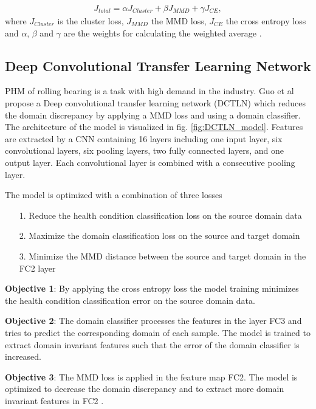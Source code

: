 \begin{equation}
    \begin{aligned}
    J_{total} = \alpha J_{Cluster} + \beta J_{MMD} + \gamma J_{CE}, 
    \end{aligned}
\end{equation}
where $J_{Cluster}$ is the cluster loss, $J_{MMD}$ the MMD loss,  $J_{CE}$ the cross entropy loss and $\alpha$, $\beta$ and $\gamma$ are the weights for calculating the weighted average \cite{Li2018}.


\subsection{Deep Convolutional Transfer Learning Network}
PHM of rolling bearing is a task with high demand in the industry. Guo et al \cite{Guo2019} propose a Deep convolutional transfer learning network (DCTLN) which reduces the domain discrepancy by applying a MMD loss and using a domain classifier. The architecture of the model is visualized in fig. \ref{fig:DCTLN_model}. Features are extracted by a CNN containing 16 layers including one input layer, six convolutional layers, six pooling layers, two fully connected layers, and one output layer. Each convolutional layer is combined with a consecutive pooling layer.


The model is optimized with a combination of three losses
\begin{itemize}
    \item [1.] Reduce the health condition classification loss on the source domain data
    \item [2.] Maximize the domain classification loss on the source and target domain 
    \item [3.] Minimize the MMD distance between the source and target domain in the FC2 layer
\end{itemize}

\textbf{Objective 1}: By applying the cross entropy loss the model training minimizes the health condition classification error on the source domain data.

\textbf{Objective 2}: The domain classifier processes the features in the layer FC3 and tries to predict the corresponding domain of each sample. The model is trained to extract domain invariant features such that the error of the domain classifier is increased.

\textbf{Objective 3}: The MMD loss is applied in the feature map FC2. The model is optimized to decrease the domain discrepancy and to extract more domain invariant features in FC2 \cite{Guo2019}. 


